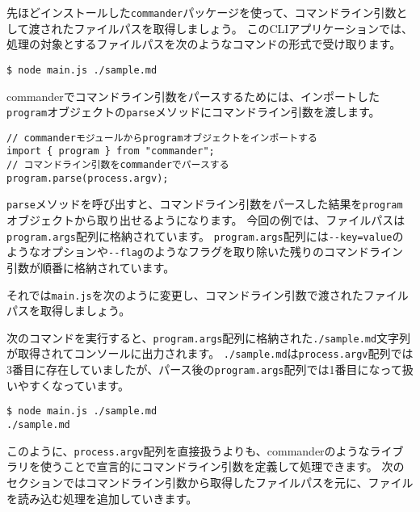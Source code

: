 先ほどインストールした\texttt{commander}パッケージを使って、コマンドライン引数として渡されたファイルパスを取得しましょう。
このCLIアプリケーションでは、処理の対象とするファイルパスを次のようなコマンドの形式で受け取ります。

\begin{lstlisting}
$ node main.js ./sample.md
\end{lstlisting}

commanderでコマンドライン引数をパースするためには、インポートした\texttt{program}オブジェクトの\texttt{parse}メソッドにコマンドライン引数を渡します。

\begin{lstlisting}
// commanderモジュールからprogramオブジェクトをインポートする
import { program } from "commander";
// コマンドライン引数をcommanderでパースする
program.parse(process.argv);
\end{lstlisting}

\texttt{parse}メソッドを呼び出すと、コマンドライン引数をパースした結果を\texttt{program}オブジェクトから取り出せるようになります。
今回の例では、ファイルパスは\texttt{program.args}配列に格納されています。
\texttt{program.args}配列には\texttt{-\/-key=value}のようなオプションや\texttt{-\/-flag}のようなフラグを取り除いた残りのコマンドライン引数が順番に格納されています。

それでは\texttt{main.js}を次のように変更し、コマンドライン引数で渡されたファイルパスを取得しましょう。



次のコマンドを実行すると、\texttt{program.args}配列に格納された\texttt{./sample.md}文字列が取得されてコンソールに出力されます。
\texttt{./sample.md}は\texttt{process.argv}配列では3番目に存在していましたが、パース後の\texttt{program.args}配列では1番目になって扱いやすくなっています。

\begin{lstlisting}
$ node main.js ./sample.md
./sample.md
\end{lstlisting}

このように、\texttt{process.argv}配列を直接扱うよりも、commanderのようなライブラリを使うことで宣言的にコマンドライン引数を定義して処理できます。
次のセクションではコマンドライン引数から取得したファイルパスを元に、ファイルを読み込む処理を追加していきます。

